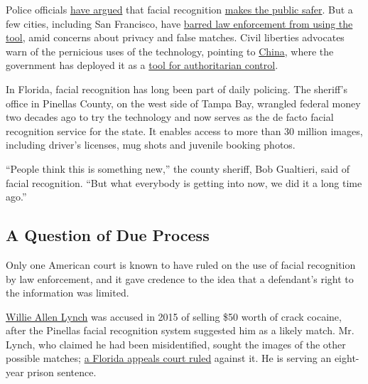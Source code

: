 Police officials
\href{https://www.nytimes.com/2019/06/09/opinion/facial-recognition-police-new-york-city.html}{have
argued} that facial recognition
\href{https://www.nytimes.com/2019/05/18/us/facial-recognition-police.html}{makes
the public safer}. But a few cities, including San Francisco, have
\href{https://www.nytimes.com/2019/05/14/us/facial-recognition-ban-san-francisco.html}{barred
law enforcement from using the tool}, amid concerns about privacy and
false matches. Civil liberties advocates warn of the pernicious uses of
the technology, pointing to
\href{https://www.nytimes.com/2019/04/14/technology/china-surveillance-artificial-intelligence-racial-profiling.html}{China},
where the government has deployed it as a
\href{https://www.nytimes.com/2019/12/17/technology/china-surveillance.html}{tool
for authoritarian control}.

In Florida, facial recognition has long been part of daily policing. The
sheriff's office in Pinellas County, on the west side of Tampa Bay,
wrangled federal money two decades ago to try the technology and now
serves as the de facto facial recognition service for the state. It
enables access to more than 30 million images, including driver's
licenses, mug shots and juvenile booking photos.

``People think this is something new,'' the county sheriff, Bob
Gualtieri, said of facial recognition. ``But what everybody is getting
into now, we did it a long time ago.''

\hypertarget{a-question-of-due-process}{%
\subsection{A Question of Due Process}\label{a-question-of-due-process}}

Only one American court is known to have ruled on the use of facial
recognition by law enforcement, and it gave credence to the idea that a
defendant's right to the information was limited.

\href{https://www.nydailynews.com/news/crime/50-crack-sale-florida-lead-facial-recognition-change-article-1.3888958}{Willie
Allen Lynch} was accused in 2015 of selling \$50 worth of crack cocaine,
after the Pinellas facial recognition system suggested him as a likely
match. Mr. Lynch, who claimed he had been misidentified, sought the
images of the other possible matches;
\href{https://law.justia.com/cases/florida/first-district-court-of-appeal/2018/16-3290.html}{a
Florida appeals court ruled} against it. He is serving an eight-year
prison sentence.

